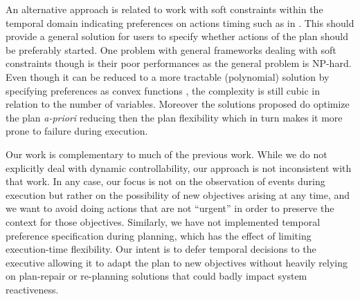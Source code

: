 An alternative approach is related to work with soft constraints
within the temporal domain indicating preferences on actions timing
such as in \cite{khatib2001temporal}. This should provide  a general
solution for users to specify whether actions of the plan should be
preferably started. One problem with general frameworks dealing with
soft constraints though is their poor performances \cite{bartak2002}
as the general problem is NP-hard. Even though it can be reduced to a
more tractable (polynomial) solution by specifying preferences as
convex functions \cite{rossi2006learning}, the  
complexity is still cubic in relation to the number of
variables. Moreover the solutions proposed do optimize the plan {\em
  a-priori} reducing then the plan flexibility which in turn makes it
more prone to failure during execution.

Our work is complementary to much of the previous work.  While we do
not explicitly deal with dynamic controllability, our approach is not
inconsistent with that work.  In any case, our focus is not on the
observation of events during execution but rather on the possibility
of new objectives arising at any time, and we want to avoid doing
actions that are not ``urgent'' in order to preserve the context for
those objectives.  Similarly, we have not implemented temporal
preference specification during planning, which has the effect of
limiting execution-time flexibility.  Our intent is to defer temporal
decisions to the executive allowing it to adapt the plan to new
objectives without heavily relying on plan-repair or re-planning
solutions that could badly impact system reactiveness.



